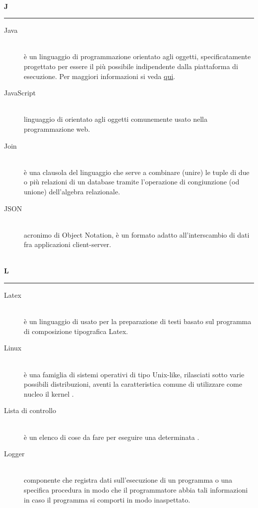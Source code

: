 \documentclass[12pt,a4paper]{article}
\begin{document}
\newpage

\begin{center}
\hfill\\
	\LARGE \textbf{J}
\hfill\\
\rule[15pt]{30pt}{0.5pt}
\end{center}
\begin{description}
\item[Java] 
\hfill\\ è un linguaggio di programmazione orientato agli oggetti, specificatamente progettato per essere il più possibile indipendente dalla piattaforma di esecuzione. Per maggiori informazioni si veda \href{https://it.wikipedia.org/wiki/Java_(linguaggio_di_programmazione)}{qui}.

\item[JavaScript] 
\hfill\\ linguaggio di  orientato agli oggetti comunemente usato nella programmazione web.

\item[Join] 
\hfill\\ è una clausola del linguaggio  che serve a combinare (unire) le tuple di due o più relazioni di un database tramite l'operazione di congiunzione (od unione) dell'algebra relazionale.

\item[JSON] 
\hfill\\ acronimo di  Object Notation, è un formato adatto all'interscambio di dati fra applicazioni client-server.
\end{description}

\newpage

\begin{center}
\hfill\\
	\LARGE \textbf{L}
\hfill\\
\rule[15pt]{30pt}{0.5pt}
\end{center}

\begin{description}
\item[Latex] 
\hfill\\ è un linguaggio di  usato per la preparazione di testi basato sul programma di composizione tipografica Latex.

\item[Linux] 
\hfill\\ è una famiglia di sistemi operativi  di tipo Unix-like, rilasciati sotto varie possibili distribuzioni, aventi la caratteristica comune di utilizzare come nucleo il kernel .

\item[Lista di controllo] 
\hfill\\ è un elenco di cose da fare per eseguire una determinata .

\item[Logger] 
\hfill\\componente che registra dati sull'esecuzione di un programma o una specifica procedura in modo che il programmatore abbia tali informazioni in caso il programma si comporti in modo inaspettato.
\end{description}
\end{document}
